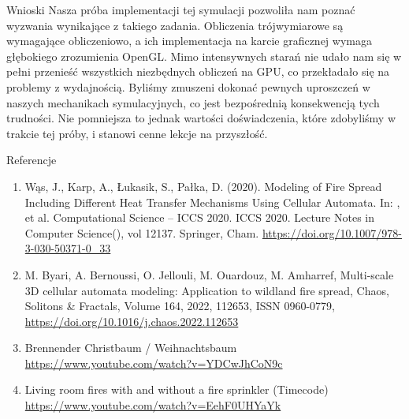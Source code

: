 \documentclass{beamer}
\begin{document}
\begin{frame}{Wnioski}
    Nasza próba implementacji tej symulacji pozwoliła nam poznać wyzwania wynikające z takiego zadania. Obliczenia trójwymiarowe są wymagające obliczeniowo, a ich implementacja na karcie graficznej wymaga głębokiego zrozumienia OpenGL. Mimo intensywnych starań nie udało nam się w pełni przenieść wszystkich niezbędnych obliczeń na GPU, co przekładało się na problemy z wydajnością. Byliśmy zmuszeni dokonać pewnych uproszczeń w naszych mechanikach symulacyjnych, co jest bezpośrednią konsekwencją tych trudności. Nie pomniejsza to jednak wartości doświadczenia, które zdobyliśmy w trakcie tej próby, i stanowi cenne lekcje na przyszłość.
\end{frame}

\begin{frame}{Referencje}
    \begin{enumerate}
        \item Wąs, J., Karp, A., Łukasik, S., Pałka, D. (2020). Modeling of Fire Spread Including Different Heat Transfer Mechanisms Using Cellular Automata. In: , et al. Computational Science – ICCS 2020. ICCS 2020. Lecture Notes in Computer Science(), vol 12137. Springer, Cham. \url{https://doi.org/10.1007/978-3-030-50371-0_33}
        \item M. Byari, A. Bernoussi, O. Jellouli, M. Ouardouz, M. Amharref, Multi-scale 3D cellular automata modeling: Application to wildland fire spread, Chaos, Solitons \& Fractals, Volume 164, 2022, 112653, ISSN 0960-0779, \url{https://doi.org/10.1016/j.chaos.2022.112653}
        \item Brennender Christbaum / Weihnachtsbaum \url{https://www.youtube.com/watch?v=YDCwJhCoN9c}
        \item Living room fires with and without a fire sprinkler (Timecode) \url{https://www.youtube.com/watch?v=EehF0UHYaYk}
    \end{enumerate}
\end{frame}
\end{document}
